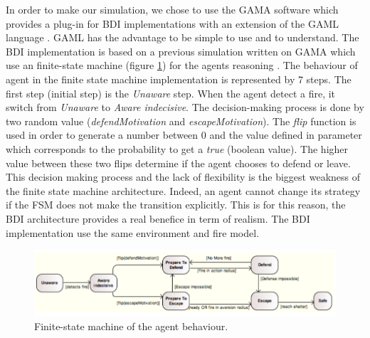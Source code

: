 \documentclass[12pt, a4paper]{memoir} %
\begin{document}
	In order to make our simulation, we chose to use the GAMA software which provides a plug-in for BDI implementations with an extension
	of the GAML language \cite{caillou2015}. GAML has the advantage to be simple to use and to understand. The BDI implementation
	is based on a previous simulation written on GAMA which use an finite-state machine (figure \ref{fig:automaton}) for the agents
	reasoning \cite{adam2015}. The behaviour of agent in the finite state machine implementation is represented by 7 steps. The first
	step (initial step) is the \textit{Unaware} step. When the agent detect a fire, it switch from \textit{Unaware} to \textit{Aware indecisive}.
	The decision-making process is done by two random value (\textit{defendMotivation} and \textit{escapeMotivation}). The \textit{flip} function is used in order to
	generate a number between 0 and the value defined in parameter which corresponds to the probability to get a \textit{true} (boolean value). The higher value between
	these two flips determine if the agent chooses to defend or leave. This decision making process and the lack of flexibility is the biggest weakness of the finite state machine
	architecture. Indeed, an agent cannot change its strategy if the FSM does not make the transition explicitly. This is for this reason, the BDI architecture provides a real benefice in term of realism.
	The BDI implementation use the same environment and fire model.

	\begin{figure}
		\begin{center}
			\includegraphics[scale=0.8]{automaton.png}
			\caption{\label{fig:automaton}Finite-state machine of the agent behaviour\cite{adam2015-2}.}
		\end{center}
	\end{figure}
\end{document}
